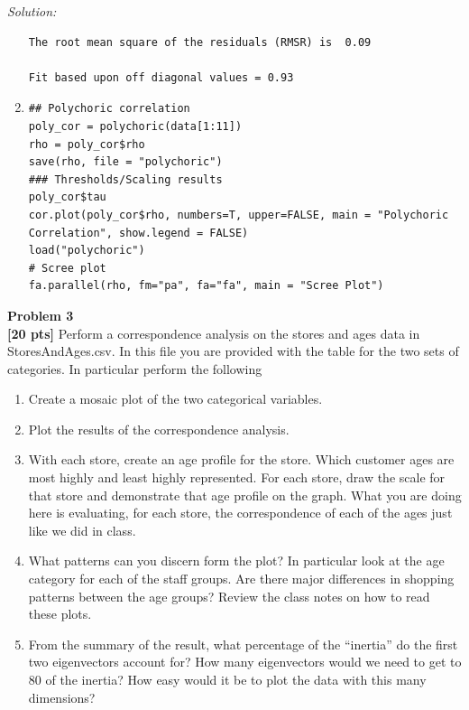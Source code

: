\documentclass{article}
\newenvironment{problem}[2][Problem]
    { \begin{mdframed}[backgroundcolor=gray!20] \textbf{#1 #2} \\}
    {  \end{mdframed}}
\newenvironment{solution}
    {\textit{Solution:}}
    {}
\begin{document}
\begin{solution}
\begin{enumerate}
\begin{lstlisting}
The root mean square of the residuals (RMSR) is  0.09 

Fit based upon off diagonal values = 0.93
	\end{lstlisting}
\item\mbox{}
	\begin{lstlisting}
## Polychoric correlation
poly_cor = polychoric(data[1:11])
rho = poly_cor$rho
save(rho, file = "polychoric")
### Thresholds/Scaling results
poly_cor$tau
cor.plot(poly_cor$rho, numbers=T, upper=FALSE, main = "Polychoric Correlation", show.legend = FALSE)
load("polychoric")
# Scree plot
fa.parallel(rho, fm="pa", fa="fa", main = "Scree Plot")
	\end{lstlisting}
\end{enumerate}
\end{solution}

\newpage
\begin{problem}{3}
\textbf{[20 pts]}
Perform a correspondence analysis on the stores and ages data in StoresAndAges.csv. In this file you are provided with the table for the two sets of categories. In particular perform the following
\begin{enumerate}
	\item Create a mosaic plot of the two categorical variables.
	\item Plot the results of the correspondence analysis.
	\item With each store, create an age profile for the store. Which customer ages are most
highly and least highly represented. For each store, draw the scale for that store and demonstrate that age profile on the graph. What you are doing here is evaluating, for each store, the correspondence of each of the ages just like we did in class.
	\item What patterns can you discern form the plot? In particular look at the age category for each of the staff groups. Are there major differences in shopping patterns between the age groups? Review the class notes on how to read these plots.
	\item From the summary of the result, what percentage of the “inertia” do the first two eigenvectors account for? How many eigenvectors would we need to get to 80 of the inertia? How easy would it be to plot the data with this many dimensions?
\end{enumerate}
\end{problem}
\end{document}
